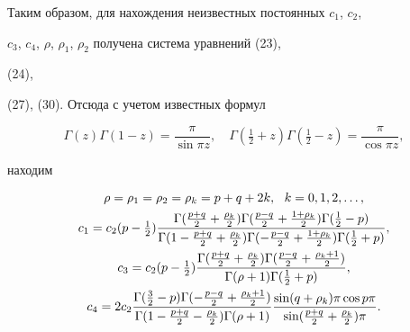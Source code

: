  


Таким образом, для нахождения неизвестных постоянных $c_1$, $c_2$, 


$c_3$, $c_4$, $\rho$, $\rho_1$, $\rho_2$ получена система уравнений (23), 


(24), 


(27), (30). Отсюда с учетом известных формул 


$$ 


\Gamma(z)\Gamma(1-z)=\frac{\pi}{\sin\pi z},\quad 


\Gamma(\tfrac{1}{2}+z)\Gamma(\tfrac{1}{2}-z)= 


\frac{\pi}{\cos\pi z}, 


$$ 


находим 


\begin{gather} 


\rho=\rho_1=\rho_2=\rho_k=p+q+2k, \ \ k=0, 1, 2,\dotsc,\notag\\ 


% 


c_1 = c_2 (p - \tfrac{1}{2})


\frac{\Gamma (\frac{p+q}{2} + \frac{\rho_k}{2}) 


\Gamma(\frac{ p-q}{2} + \frac{1 + \rho_k}{2}) \Gamma(\frac{1}{2} - p)} 


{\Gamma(1 - \frac{p+q}{2} + 


\frac{\rho_k}{2}) \Gamma( - \frac{ p - q}{2} +  


\frac{1 + \rho_k}{2}) 


\Gamma(\frac{1}{2}+ p)} ,\\


% 


c_3 = c_2(p - \tfrac{1}{2})


 \frac{\Gamma ( \frac{p + q}{2} + \frac{\rho_k}{2}) \Gamma (\frac{ p - 


q}{2} + \frac{\rho_k + 1}{2})} 


{\Gamma (\rho + 1) \Gamma (\frac{1}{2}+ p)} ,\\


%


c_4 = 2c_2 \frac{\Gamma (\frac{3}{2}-p) \Gamma (-\frac{p - q}{2} + 


\frac{\rho_k + 1}{2})} 


{\Gamma (1 - \frac{p + q}{2}-\frac{\rho_k}{2}) \Gamma (\rho+1)}


\frac{\sin(q + \rho_k) \pi \cos p \pi}{\sin (\frac{p + q}{2} 


+\frac{\rho_k}{2})\pi}.


\end{gather} 


